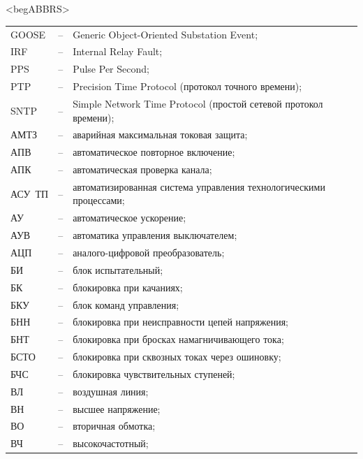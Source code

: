 \color{unimain}\section*{}
{\color{white}\fontsize{0.1pt}{0.1pt}\selectfont<begABBRS>}
\color{black}
\begin{longtable}{>{\raggedright\arraybackslash}m{2cm}>{\raggedright\arraybackslash}m{0.5cm}>{\raggedright\arraybackslash}m{20cm}}
\endfirsthead\endhead\endfoot\endlastfoot
GOOSE & -- & Generic Object-Oriented Substation Event; \\
IRF & -- & Internal Relay Fault; \\
PPS & -- & Pulse Per Second; \\
PTP & -- & Precision Time Protocol (протокол точного времени); \\
SNTP & -- & Simple Network Time Protocol (простой сетевой протокол времени); \\
АМТЗ & -- & аварийная максимальная токовая защита; \\
АПВ & -- & автоматическое повторное включение; \\
АПК & -- & автоматическая проверка канала; \\
АСУ~ТП & -- & автоматизированная система управления технологическими процессами; \\
АУ & -- & автоматическое ускорение; \\
АУВ & -- & автоматика управления выключателем; \\
АЦП & -- & аналого-цифровой преобразователь; \\
БИ & -- & блок испытательный; \\
БК & -- & блокировка при качаниях; \\
БКУ & -- & блок команд управления; \\
БНН & -- & блокировка при неисправности цепей напряжения; \\
БНТ & -- & блокировка при бросках намагничивающего тока; \\
БСТО & -- & блокировка при сквозных токах через ошиновку; \\
БЧС & -- & блокировка чувствительных ступеней; \\
ВЛ & -- & воздушная линия; \\
ВН & -- & высшее напряжение; \\
ВО & -- & вторичная обмотка; \\
ВЧ & -- & высокочастотный; \\

\end{longtable}
